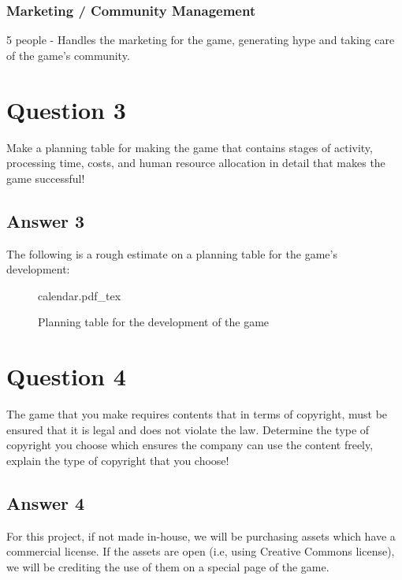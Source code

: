 \documentclass[
  11pt, %
]{assignment}
\begin{document}
\subsubsection*{Marketing / Community Management} 5 people - Handles the marketing for the game, generating hype and taking care of the game's community.

\pagebreak

\section*{Question 3}

\begin{problem}
Make a planning table for making the game that contains stages of activity, processing time, costs, and human resource allocation in detail that makes the game successful!
\end{problem}

\subsection*{Answer 3}

The following is a rough estimate on a planning table for the game's development:

\begin{figure}[ht]
  \centering
  {calendar.pdf_tex}
  \caption{Planning table for the development of the game}
\end{figure}



\section*{Question 4}

\begin{problem}
The game that you make requires contents that in terms of copyright, must be ensured that it is legal and does not violate the law. Determine the type of copyright you choose which ensures the company can use the content freely, explain the type of copyright that you choose!
\end{problem}

\subsection*{Answer 4}

For this project, if not made in-house, we will be purchasing assets which have a commercial license. If the assets are open (i.e, using Creative Commons license), we will be crediting the use of them on a special page of the game.
\end{document}
